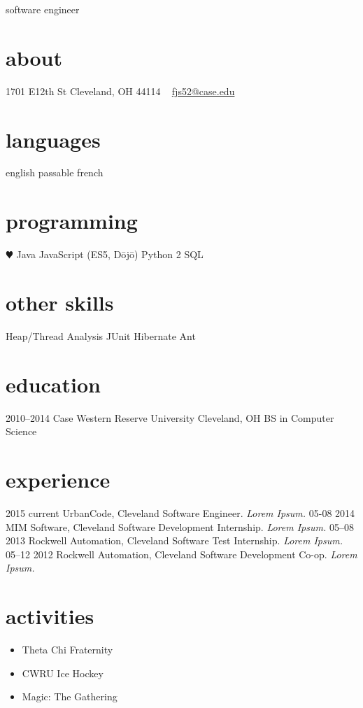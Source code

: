 \documentclass[]{friggeri-cv} %
\begin{document}
       {software engineer}


\begin{aside}
  \section{about}
    1701 E12th St
    Cleveland, OH
    44114
    ~
    \href{mailto:fjs52@case.edu}{fjs52@case.edu}
  \section{languages}
    english
    passable french
  \section{programming}
    {\color{red} $\varheartsuit$} Java
    JavaScript
    (ES5, D\=oj\=o)
    Python 2
    SQL
  \section{other skills}
    Heap/Thread Analysis
    JUnit
    Hibernate
    Ant
\end{aside}

\section{education}

\begin{entrylist}
  \entry
    {2010–2014}
    {Case Western Reserve University}
    {Cleveland, OH}
    {BS in Computer Science}
\end{entrylist}

\section{experience}

\begin{entrylist}
  \entry
    {2015 current}
    {UrbanCode, Cleveland}
    {Software Engineer.}
    {\emph{Lorem Ipsum.}}
  \entry
    {05-08 2014}
    {MIM Software, Cleveland}
    {Software Development Internship.}
    {\emph{Lorem Ipsum.}}
  \entry
    {05–08 2013}
    {Rockwell Automation, Cleveland}
    {Software Test Internship.}
    {\emph{Lorem Ipsum.}}
  \entry
    {05–12 2012}
    {Rockwell Automation, Cleveland}
    {Software Development Co-op.}
    {\emph{Lorem Ipsum.}}
\end{entrylist}

\section{activities}
\begin{itemize}
    \item Theta Chi Fraternity
    \item CWRU Ice Hockey
    \item Magic: The Gathering
\end{itemize}
\end{document}
